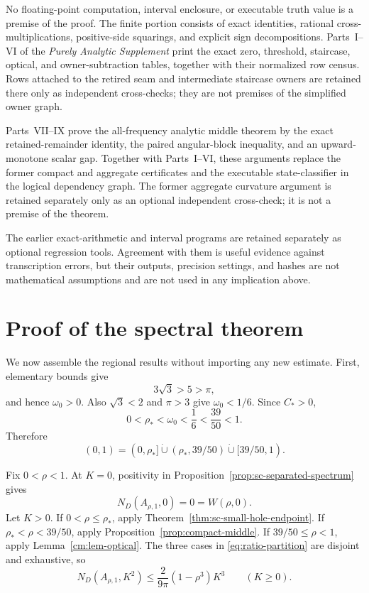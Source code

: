 \documentclass[11pt]{article}
\numberwithin{equation}{section}
\theoremstyle{definition}
\theoremstyle{remark}
\begin{document}
No floating-point computation, interval enclosure, or executable truth value
is a premise of the proof.  The finite portion consists of exact identities,
rational cross-multiplications, positive-side squarings, and explicit sign
decompositions.  Parts~I--VI of the \emph{Purely Analytic Supplement} print
the exact zero, threshold, staircase, optical, and owner-subtraction tables,
together with their normalized row census.  Rows attached to the retired
seam and intermediate staircase owners are retained there only as independent
cross-checks; they are not premises of the simplified owner graph.

Parts~VII--IX prove the all-frequency analytic middle theorem by the exact
retained-remainder identity, the paired angular-block inequality, and an
upward-monotone scalar gap.  Together with Parts~I--VI, these arguments
replace the former compact and aggregate certificates and the executable
state-classifier in the logical dependency graph.  The former aggregate
curvature argument is retained separately only as an optional independent
cross-check; it is not a premise of the theorem.

The earlier exact-arithmetic and interval programs are retained separately
as optional regression tools.  Agreement with them is useful evidence
against transcription errors, but their outputs, precision settings, and
hashes are not mathematical assumptions and are not used in any implication
above.

\section{Proof of the spectral theorem}

We now assemble the regional results without importing any new estimate.
First, elementary bounds give
\[
  3\sqrt3>5>\pi,
\]
and hence \(\omega_0>0\).  Also \(\sqrt3<2\) and \(\pi>3\) give
\(\omega_0<1/6\).  Since \(C_*>0\),
\begin{equation}
  0<\rho_*<\omega_0<\frac16<\frac{39}{50}<1.
  \label{eq:ratio-ordering}
\end{equation}
Therefore
\begin{equation}
  (0,1)
  =(0,\rho_*]\mathbin{\dot\cup}
  (\rho_*,39/50)\mathbin{\dot\cup}
  [39/50,1).
  \label{eq:ratio-partition}
\end{equation}

Fix \(0<\rho<1\).  At \(K=0\), positivity in
Proposition~\ref{prop:sc-separated-spectrum} gives
\begin{equation}
  N_D(A_{\rho,1},0)=0=W(\rho,0).
  \label{eq:k-zero}
\end{equation}
Let \(K>0\).  If \(0<\rho\le\rho_*\), apply
Theorem~\ref{thm:sc-small-hole-endpoint}.  If
\(\rho_*<\rho<39/50\), apply
Proposition~\ref{prop:compact-middle}.  If \(39/50\le\rho<1\), apply
Lemma~\ref{cm:lem-optical}.  The three cases in
\eqref{eq:ratio-partition} are disjoint and exhaustive, so
\begin{equation}
  N_D(A_{\rho,1},K^2)
  \le\frac{2}{9\pi}(1-\rho^3)K^3
  \qquad(K\ge0).
  \label{eq:unit-shell-theorem}
\end{equation}
\end{document}
